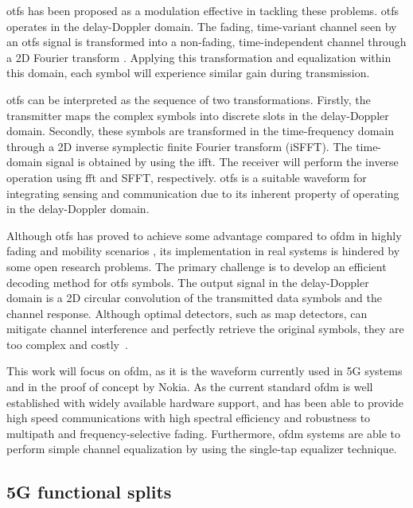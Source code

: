 	\Gls{otfs} has been proposed as a modulation effective in tackling these problems. \Gls{otfs} operates in the delay-Doppler domain. 
	The fading, time-variant channel seen by an \gls{otfs} signal is transformed into a non-fading, time-independent channel through a 2D Fourier transform \cite{OTFS_Hadani_2017}. 
	Applying this transformation and equalization within this domain, each symbol will experience similar gain during transmission.
	
	\gls{otfs} can be interpreted as the sequence of two transformations. 
	Firstly, the transmitter maps the complex symbols into discrete slots in the delay-Doppler domain.
	Secondly, these symbols are transformed in the time-frequency domain through a 2D inverse symplectic finite Fourier transform (iSFFT). The time-domain signal is obtained by using the \gls{ifft}. 
	The receiver will perform the inverse operation using \gls{fft} and SFFT, respectively.
	\gls{otfs} is a suitable waveform for integrating sensing and communication due to its inherent property of operating in the delay-Doppler domain.
	
	Although \gls{otfs} has proved to achieve some advantage compared to \gls{ofdm} in highly fading and mobility scenarios \cite{OTFS_Hadani_2017}, its implementation in real systems is hindered by some open research problems. 
	The primary challenge is to develop an efficient decoding method for \gls{otfs} symbols.
	The output signal in the delay-Doppler domain is a 2D circular convolution of the transmitted data symbols and the channel response. Although optimal detectors, such as \gls{map} detectors, can mitigate channel interference and perfectly retrieve the original symbols, they are too complex and costly~\cite{Raviteja_Viterbo_OTFS_decoding}.
	
	This work will focus on \gls{ofdm}, as it is the waveform currently used in 5G systems and in the proof of concept by Nokia. 
	As the current standard \gls{ofdm} is well established with widely available hardware support, and has been able to provide high speed communications with high spectral efficiency and robustness to multipath and frequency-selective fading.
	Furthermore, \gls{ofdm} systems are able to perform simple channel equalization by using the single-tap equalizer technique.
	
	 
	
	\subsection{5G functional splits}
	
